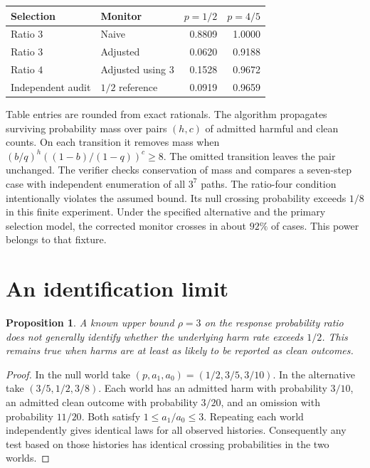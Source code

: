 \documentclass[11pt]{article}
\newtheorem{proposition}{Proposition}
\begin{document}
\begin{center}
\begin{tabular}{llrr}
\toprule
Selection & Monitor & $p=1/2$ & $p=4/5$ \\
\midrule
Ratio $3$ & Naive & 0.8809 & 1.0000 \\
Ratio $3$ & Adjusted & 0.0620 & 0.9188 \\
Ratio $4$ & Adjusted using $3$ & 0.1528 & 0.9672 \\
Independent audit & $1/2$ reference & 0.0919 & 0.9659 \\
\bottomrule
\end{tabular}
\end{center}
Table entries are rounded from exact rationals. The algorithm
propagates surviving probability mass over pairs $(h,c)$ of admitted
harmful and clean counts. On each transition it removes mass when
$(b/q)^h((1-b)/(1-q))^c\ge8$. The omitted transition leaves the
pair unchanged. The verifier checks conservation of mass and
compares a seven-step case with independent enumeration of all
$3^7$ paths. The ratio-four condition intentionally violates the
assumed bound. Its null crossing probability exceeds $1/8$ in
this finite experiment. Under the specified alternative and the
primary selection model, the corrected monitor crosses in about
$92\%$ of cases. This power belongs to that fixture.

\section{An identification limit}
\begin{proposition}
A known upper bound $\rho=3$ on the response probability ratio
does not generally identify whether the underlying harm rate
exceeds $1/2$. This remains true when harms are at least as likely
to be reported as clean outcomes.
\end{proposition}
\begin{proof}
In the null world take $(p,a_1,a_0)=(1/2,3/5,3/10)$.
In the alternative take $(3/5,1/2,3/8)$. Each world has an
admitted harm with probability $3/10$, an admitted clean
outcome with probability $3/20$, and an omission with probability
$11/20$. Both satisfy $1\le a_1/a_0\le3$.
Repeating each world independently gives identical laws for all
observed histories. Consequently any test based on those histories
has identical crossing probabilities in the two worlds.
\end{proof}
\end{document}
